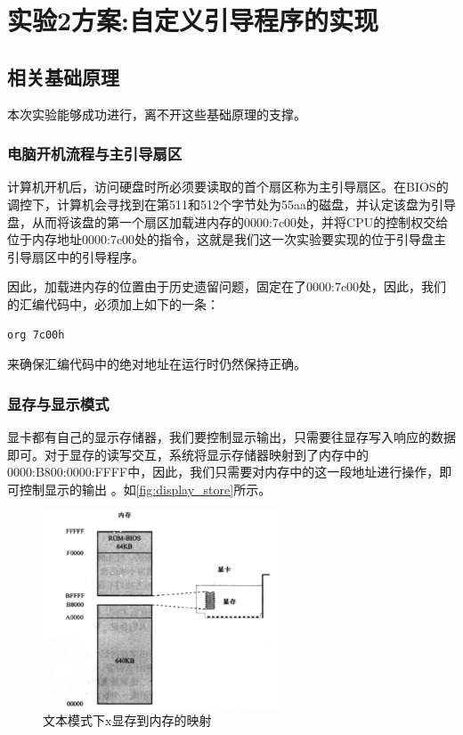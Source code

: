 \documentclass[forprint]{WHUBachelor}
\begin{document}
\chapter{实验2方案:自定义引导程序的实现}

\section{相关基础原理}

本次实验能够成功进行，离不开这些基础原理的支撑。

\subsection{电脑开机流程与主引导扇区}

计算机开机后，访问硬盘时所必须要读取的首个扇区称为主引导扇区\cite{wiki:mainbootrecord}。在BIOS的调控下，计算机会寻找到在第511和512个字节处为55aa的磁盘，并认定该盘为引导盘，从而将该盘的第一个扇区加载进内存的0000:7c00处，并将CPU的控制权交给位于内存地址0000:7c00处的指令，这就是我们这一次实验要实现的位于引导盘主引导扇区中的引导程序。

因此，加载进内存的位置由于历史遗留问题，固定在了0000:7c00处，因此，我们的汇编代码中，必须加上如下的一条：
\begin{lstlisting}
org 7c00h
\end{lstlisting}
来确保汇编代码中的绝对地址在运行时仍然保持正确。


\subsection{显存与显示模式}

显卡都有自己的显示存储器，我们要控制显示输出，只需要往显存写入响应的数据即可。对于显存的读写交互，系统将显示存储器映射到了内存中的0000:B800:0000:FFFF中，因此，我们只需要对内存中的这一段地址进行操作，即可控制显示的输出\cite{2013x86汇编语言从实模式到保护模式} 。如\autoref{fig:display_store}所示。

\begin{figure}[htp]
  \centering
  \includegraphics[width=7cm]{"./figure/display_store.png"}
  \caption{文本模式下x显存到内存的映射}
  \label{fig:display_store}
\end{figure}
\end{document}
